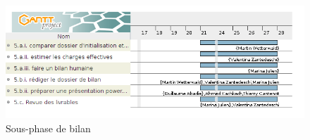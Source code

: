 \begin{figure}[h]
    \centering
    \includegraphics[scale=0.65]{images/SPIE_5.png}
    \caption{Sous-phase de bilan}
    \label{diagram:si_map}
\end{figure}
